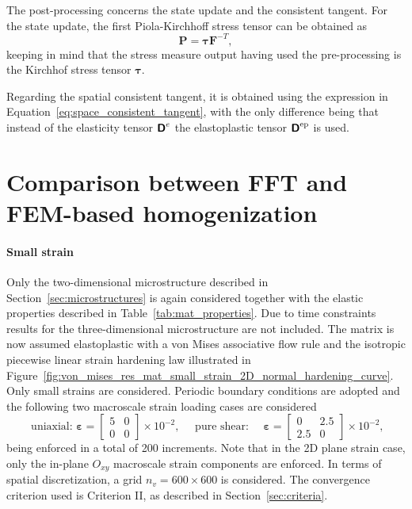 The post-processing concerns the state update and the consistent tangent.
For the state update, the first Piola-Kirchhoff stress tensor can be obtained as
\begin{equation}
\bm P = \bm \tau \bm F^{-T},
\end{equation}
keeping in mind that the stress measure output having used the pre-processing is the Kirchhof stress tensor \(\bm \tau\).

Regarding the spatial consistent tangent, it is obtained using the expression in Equation~\eqref{eq:space_consistent_tangent}, with the only difference being that instead of the elasticity tensor \(\boldsymbol{\mathsf{D}}^e\) the elastoplastic tensor \(\boldsymbol{\mathsf{D}}^\text{ep}\) is used.

\section{Comparison between FFT and FEM-based homogenization}

\paragraph{Small strain}

Only the two-dimensional microstructure described in Section~\ref{sec:microstructures} is again considered together with the elastic properties described in Table~\ref{tab:mat_properties}.
Due to time constraints results for the three-dimensional microstructure are not included.
The matrix is now assumed elastoplastic with a von Mises associative flow rule and the isotropic piecewise linear strain hardening law illustrated in Figure~\ref{fig:von_mises_res_mat_small_strain_2D_normal_hardening_curve}.
Only small strains are considered.
Periodic boundary conditions are adopted and the following two macroscale strain loading cases are considered
\begin{equation}
\text { uniaxial: } \bm{\varepsilon}=\left[\begin{array}{cc}
5 & 0 \\
0 & 0
\end{array}\right] \times 10^{-2}, \quad \text { pure shear: } \quad \bm \varepsilon=\left[\begin{array}{cc}
0 & 2.5 \\
2.5 & 0
\end{array}\right] \times 10^{-2},
\end{equation}
being enforced in a total of 200 increments.
Note that in the 2D plane strain case, only the in-plane \(O_{x y}\) macroscale strain components are enforced.
In terms of spatial discretization, a grid \(n_{v}=600 \times 600\) is considered.
The convergence criterion used is Criterion II, as described in Section~\ref{sec:criteria}.

